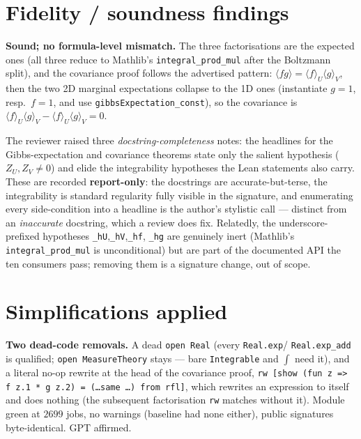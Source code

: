 \documentclass[11pt]{article}
\begin{document}
\section{Fidelity / soundness findings}
\textbf{Sound; no formula-level mismatch.} The three factorisations are the expected ones (all
three reduce to Mathlib's \texttt{integral\_prod\_mul} after the Boltzmann split), and the
covariance proof follows the advertised pattern: $\langle fg\rangle=\langle f\rangle_U\langle
g\rangle_V$, then the two 2D marginal expectations collapse to the 1D ones (instantiate $g=1$,
resp.\ $f=1$, and use \texttt{gibbsExpectation\_const}), so the covariance is
$\langle f\rangle_U\langle g\rangle_V-\langle f\rangle_U\langle g\rangle_V=0$.

The reviewer raised three \emph{docstring-completeness} notes: the headlines for the
Gibbs-expectation and covariance theorems state only the salient hypothesis ($Z_U,Z_V\ne0$) and
elide the integrability hypotheses the Lean statements also carry. These are recorded
\textbf{report-only}: the docstrings are accurate-but-terse, the integrability is standard
regularity fully visible in the signature, and enumerating every side-condition into a headline is
the author's stylistic call --- distinct from an \emph{inaccurate} docstring, which a review does
fix. Relatedly, the underscore-prefixed hypotheses \texttt{\_hU},\texttt{\_hV},\texttt{\_hf},%
\texttt{\_hg} are genuinely inert (Mathlib's \texttt{integral\_prod\_mul} is unconditional) but are
part of the documented API the ten consumers pass; removing them is a signature change, out of
scope.

\section{Simplifications applied}
\textbf{Two dead-code removals.} A dead \texttt{open Real} (every \texttt{Real.exp}/%
\texttt{Real.exp\_add} is qualified; \texttt{open MeasureTheory} stays --- bare \texttt{Integrable}
and \texttt{$\int$} need it), and a literal no-op rewrite at the head of the covariance proof,
\texttt{rw [show (fun z => f z.1 * g z.2) = (\dots same \dots) from rfl]}, which rewrites an
expression to itself and does nothing (the subsequent factorisation \texttt{rw} matches without
it). Module green at $2699$ jobs, no warnings (baseline had none either), public signatures
byte-identical. GPT affirmed.
\end{document}
